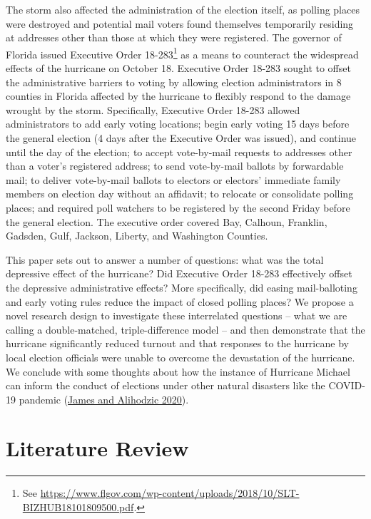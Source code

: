 \documentclass[
  12pt,
]{article}
\begin{document}
The storm also affected the administration of the election itself, as polling places were destroyed and potential mail voters found themselves temporarily residing at addresses other than those at which they were registered. The governor of Florida issued Executive Order 18-283\footnote{See \url{https://www.flgov.com/wp-content/uploads/2018/10/SLT-BIZHUB18101809500.pdf}.} as a means to counteract the widespread effects of the hurricane on October 18. Executive Order 18-283 sought to offset the administrative barriers to voting by allowing election administrators in 8 counties in Florida affected by the hurricane to flexibly respond to the damage wrought by the storm. Specifically, Executive Order 18-283 allowed administrators to add early voting locations; begin early voting 15 days before the general election (4 days after the Executive Order was issued), and continue until the day of the election; to accept vote-by-mail requests to addresses other than a voter's registered address; to send vote-by-mail ballots by forwardable mail; to deliver vote-by-mail ballots to electors or electors' immediate family members on election day without an affidavit; to relocate or consolidate polling places; and required poll watchers to be registered by the second Friday before the general election. The executive order covered Bay, Calhoun, Franklin, Gadsden, Gulf, Jackson, Liberty, and Washington Counties.

This paper sets out to answer a number of questions: what was the total depressive effect of the hurricane? Did Executive Order 18-283 effectively offset the depressive administrative effects? More specifically, did easing mail-balloting and early voting rules reduce the impact of closed polling places? We propose a novel research design to investigate these interrelated questions -- what we are calling a double-matched, triple-difference model -- and then demonstrate that the hurricane significantly reduced turnout and that responses to the hurricane by local election officials were unable to overcome the devastation of the hurricane. We conclude with some thoughts about how the instance of Hurricane Michael can inform the conduct of elections under other natural disasters like the COVID-19 pandemic (\protect\hyperlink{ref-James2020}{James and Alihodzic 2020}).

\hypertarget{literature-review}{%
\section*{Literature Review}\label{literature-review}}
\end{document}

